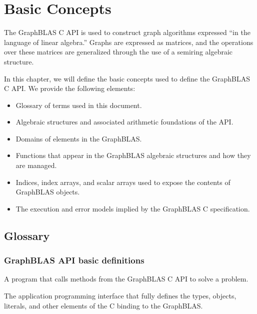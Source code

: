 \chapter{Basic Concepts}
\label{Chp:Concepts}

The GraphBLAS C API is used to construct  
graph algorithms expressed ``in the language of linear algebra.''
Graphs are expressed as matrices, and the operations over 
these matrices are generalized through the use of a
semiring algebraic structure.

In this chapter, we will define the basic concepts used to
define the GraphBLAS C API.  We provide the following elements:
\begin{itemize}
\item Glossary of terms used in this document.  

\item Algebraic structures and associated arithmetic foundations of the API.

\item Domains of elements in the GraphBLAS.  

\item Functions that appear in the GraphBLAS algebraic 
structures and how they are managed.

\item Indices, index arrays, and scalar arrays used
to expose the contents of GraphBLAS objects.  

\item The execution and error models implied by the GraphBLAS C specification.

\end{itemize}

\section{Glossary}

\subsection{GraphBLAS API basic definitions}

\glossBegin

 A program that calls methods from the GraphBLAS C API to
solve a problem.

 The application programming interface that fully defines the types, objects, 
literals, and other elements of the C binding to the GraphBLAS.

